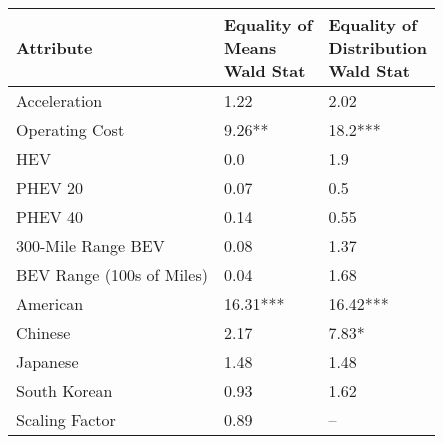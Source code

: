 \begin{tabular}{lll}
\toprule
                Attribute & \makecell{Equality of \\ Means \\ Wald Stat} & \makecell{Equality of \\ Distribution \\ Wald Stat} \\
\midrule
             Acceleration &                        \multirow{1}{*}{1.22} &                              \multirow{1}{*}{2.02} \\
           Operating Cost &                      \multirow{1}{*}{9.26**} &                           \multirow{1}{*}{18.2***} \\
                      HEV &                         \multirow{1}{*}{0.0} &                               \multirow{1}{*}{1.9} \\
                  PHEV 20 &                        \multirow{1}{*}{0.07} &                               \multirow{1}{*}{0.5} \\
                  PHEV 40 &                        \multirow{1}{*}{0.14} &                              \multirow{1}{*}{0.55} \\
       300-Mile Range BEV &                        \multirow{1}{*}{0.08} &                              \multirow{1}{*}{1.37} \\
BEV Range (100s of Miles) &                        \multirow{1}{*}{0.04} &                              \multirow{1}{*}{1.68} \\
                 American &                    \multirow{1}{*}{16.31***} &                          \multirow{1}{*}{16.42***} \\
                  Chinese &                        \multirow{1}{*}{2.17} &                             \multirow{1}{*}{7.83*} \\
                 Japanese &                        \multirow{1}{*}{1.48} &                              \multirow{1}{*}{1.48} \\
             South Korean &                        \multirow{1}{*}{0.93} &                              \multirow{1}{*}{1.62} \\
           Scaling Factor &                        \multirow{1}{*}{0.89} &                                                 -- \\
\bottomrule
\end{tabular}

